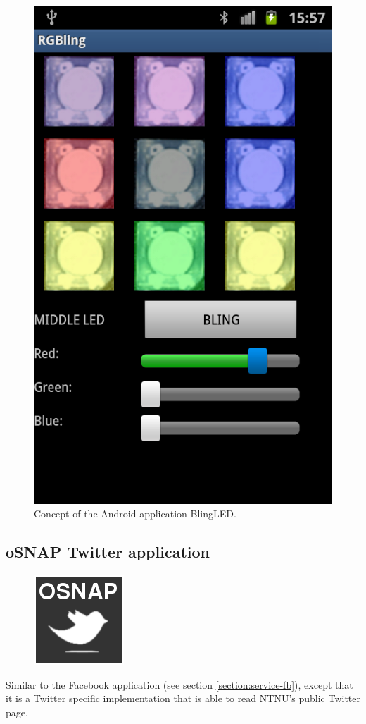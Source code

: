 \begin{figure}[h!]
	\begin{center}
	\includegraphics[scale=0.35]{img/prototype3rgBling.png}
	\end{center}
	\caption{Concept of the Android application BlingLED.}
	\label{fig:design-ledmatrix}
\end{figure}

\subsection{oSNAP Twitter application}
\begin{figure}
	\centering \includegraphics[scale=0.25]{img/app-twitter}
\end{figure}
Similar to the Facebook application (see section \ref{section:service-fb}),
except that it is a Twitter specific implementation that is able to read NTNU's public Twitter page.


